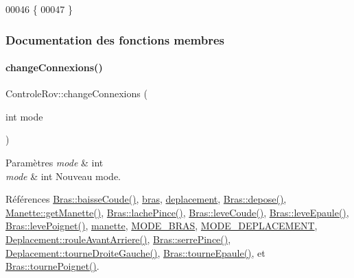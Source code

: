 \begin{DoxyCode}
00046 \{
00047 \}
\end{DoxyCode}


\subsubsection{Documentation des fonctions membres}
\mbox{\label{class_controle_rov_a400d5766b9acabb45c1af5f8b22bbe47}} 
\paragraph{\texorpdfstring{change\+Connexions()}{changeConnexions()}}
{\footnotesize\ttfamily Controle\+Rov\+::change\+Connexions (\begin{DoxyParamCaption}\item[{int}]{mode }\end{DoxyParamCaption})\hspace{0.3cm}{\ttfamily [private]}}


\begin{DoxyParams}{Paramètres}
{\em mode} & int\\
\hline
{\em mode} & int Nouveau mode. \\
\hline
\end{DoxyParams}


Références \hyperlink{class_bras_a4b8e4791a454fcf884b1e7217a16a326}{Bras\+::baisse\+Coude()}, \hyperlink{class_controle_rov_a1b2e394dd6332b2acd1be0770451e140}{bras}, \hyperlink{class_controle_rov_ae96443be0a82814b27958e6ceb0a0acf}{deplacement}, \hyperlink{class_bras_a69d95616a74732e13b23bd90680d7d21}{Bras\+::depose()}, \hyperlink{class_manette_a708eccb66e967e0fe575b19e9899ff5a}{Manette\+::get\+Manette()}, \hyperlink{class_bras_a246e835f25bd61f0618c58aafea99ea1}{Bras\+::lache\+Pince()}, \hyperlink{class_bras_a197686a4ff55b4fe2384b2af44b8228b}{Bras\+::leve\+Coude()}, \hyperlink{class_bras_ac8f658db87d03bfbba6faa535326cc3a}{Bras\+::leve\+Epaule()}, \hyperlink{class_bras_ac95f54d8b02e7c88081f482fbbc40aef}{Bras\+::leve\+Poignet()}, \hyperlink{class_controle_rov_af5caffd78d06f90d045b53ee87ad76df}{manette}, \hyperlink{controlerov_8h_aa7e25e50c4dd52bfc6abcb3e450686d4}{M\+O\+D\+E\+\_\+\+B\+R\+AS}, \hyperlink{controlerov_8h_a427f99e4fe2f812b0f49a09025623653}{M\+O\+D\+E\+\_\+\+D\+E\+P\+L\+A\+C\+E\+M\+E\+NT}, \hyperlink{class_deplacement_a65a1c6adfe5114d3cfefa631e0c91618}{Deplacement\+::roule\+Avant\+Arriere()}, \hyperlink{class_bras_a55e143cf8e696ed214809ae25fb558d5}{Bras\+::serre\+Pince()}, \hyperlink{class_deplacement_a164cc606a6c5b8d55c1e5475d4d112e0}{Deplacement\+::tourne\+Droite\+Gauche()}, \hyperlink{class_bras_aaeacb18f22532a63559fc8430118169e}{Bras\+::tourne\+Epaule()}, et \hyperlink{class_bras_a15beae8aa104c2e689614486646ab402}{Bras\+::tourne\+Poignet()}.



